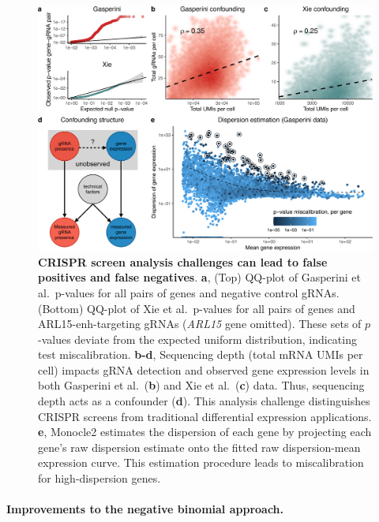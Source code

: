 \documentclass{nature}
\begin{document}
\begin{figure}[h!]
\includegraphics[width = \textwidth]{figures/Figure1/Figure1_cropped.pdf}
\caption{\textbf{CRISPR screen analysis challenges can lead to false positives and false negatives}. \textbf{a}, (Top) QQ-plot of Gasperini et al.\ p-values for all pairs of genes and negative control gRNAs. (Bottom) QQ-plot of Xie et al.\ p-values for all pairs of genes and ARL15-enh-targeting gRNAs (\textit{ARL15} gene omitted). These sets of $p$-values deviate from the expected uniform distribution, indicating test miscalibration. \textbf{b-d}, Sequencing depth (total mRNA UMIs per cell) impacts gRNA detection and observed gene expression levels in both Gasperini et al.\ (\textbf{b}) and Xie et al.\ (\textbf{c}) data. Thus, sequencing depth acts as a confounder (\textbf{d}). This analysis challenge distinguishes CRISPR screens from traditional differential expression applications. \textbf{e}, Monocle2 estimates the dispersion of each gene by projecting each gene's raw dispersion estimate onto the fitted raw dispersion-mean expression curve. This estimation procedure leads to miscalibration for high-dispersion genes.  %
}
 \label{fig:analysis-challenges}
\end{figure}
\clearpage

\paragraph{Improvements to the negative binomial approach.} 
\end{document}
